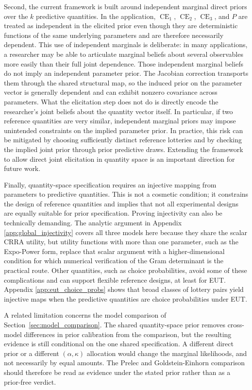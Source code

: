 \documentclass[12pt,a4paper]{article}
\theoremstyle{definition}
\theoremstyle{remark}
\DeclareMathOperator{\CE}{CE}
\begin{document}
Second, the current framework is built around independent marginal direct
priors over the $k$ predictive quantities. In the application, $\CE_1$,
$\CE_2$, $\CE_3$, and $P$ are treated as independent in the elicited prior even
though they are deterministic functions of the same underlying parameters and
are therefore necessarily dependent. This use of independent marginals is
deliberate: in many applications, a researcher may be able to articulate
marginal beliefs about several observables more easily than their full joint
dependence. Those independent marginal beliefs do not imply an independent
parameter prior. The Jacobian correction transports them through the shared
structural map, so the induced prior on the parameter vector is generally
dependent and can exhibit nonzero covariance across parameters.
What the elicitation step does not do is directly encode the researcher's joint
beliefs about the quantity vector itself. In particular, if two reference
quantities are very similar, independent marginal priors may impose unintended
constraints on the implied parameter prior. In practice, this risk can be
mitigated by choosing sufficiently distinct reference lotteries and by checking
the implied joint prior through prior predictive draws. Extending the framework
to allow direct joint elicitation in quantity space is an important direction
for future work.

Finally, quantity-space specification requires an injective mapping from
parameters to predictive quantities. This is not a cosmetic condition; it
constrains the design of reference quantities and implies that not all
experimental designs are equally suitable for prior specification. Proving
injectivity can also be technically demanding. The analytic argument in
Appendix \ref{app:global_injectivity} covers all three models here because
they share the scalar CRRA utility, but utility functions with more than one
parameter, such as the Expo-Power form, replace that scalar argument with a
higher-dimensional condition for which numerical verification of the Gram
determinant is the practical route. Other quantities, such
as choice probabilities, avoid some of these complications and can support
flexible reference designs, at least for EUT\@.
Appendix \ref{app:eut_choice_probs} shows that broad classes of lottery pairs
yield injective maps when the predictive quantities are choice probabilities
under EUT\@.

A related limitation concerns the model comparison of
Section~\ref{sec:model_comparison}. The shared quantity-space prior removes
cross-model differences in prior calibration from the comparison, but the
resulting evidence is still conditional on the one shared specification.
A different direct prior or a different $(\alpha, \kappa)$ allocation would
change the marginal likelihoods, and not necessarily by equal amounts. The
Prelec and Goldstein-Einhorn comparison should therefore be read as
evidence under the stated prior rather than as a prior-free verdict.
\end{document}
